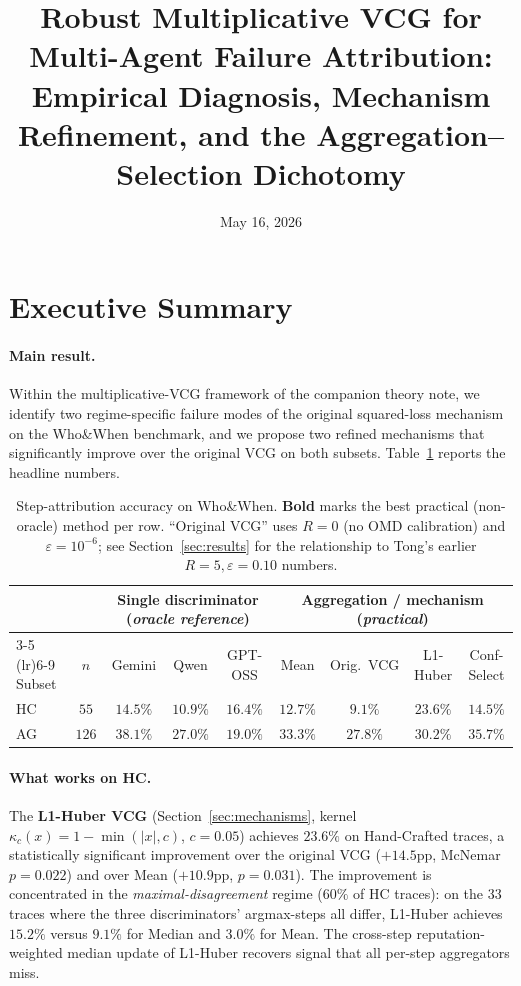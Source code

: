 \documentclass[11pt]{article}
\title{Robust Multiplicative VCG for Multi-Agent Failure Attribution:\\
{\large Empirical Diagnosis, Mechanism Refinement, and the Aggregation--Selection Dichotomy}}
\author{}
\date{May 16, 2026}
\begin{document}
\maketitle

\section*{Executive Summary}

\paragraph{Main result.}
Within the multiplicative-VCG framework of the companion theory note, we
identify two regime-specific failure modes of the original squared-loss
mechanism on the Who\&When benchmark, and we propose two refined
mechanisms that significantly improve over the original VCG on both
subsets. Table~\ref{tab:summary-positive} reports the headline numbers.

\begin{table}[h]
\centering
\small
\caption{Step-attribution accuracy on Who\&When. \textbf{Bold} marks the
best practical (non-oracle) method per row. ``Original VCG'' uses
$R = 0$ (no OMD calibration) and $\varepsilon = 10^{-6}$; see
Section~\ref{sec:results} for the relationship to Tong's earlier
$R = 5, \varepsilon = 0.10$ numbers.}
\label{tab:summary-positive}
\setlength{\tabcolsep}{4pt}
\begin{tabular}{lcccccccc}
\toprule
& & \multicolumn{3}{c}{Single discriminator (\emph{oracle reference})} & \multicolumn{4}{c}{Aggregation / mechanism (\emph{practical})} \\
\cmidrule(lr){3-5} \cmidrule(lr){6-9}
Subset & $n$ & Gemini & Qwen & GPT-OSS & Mean & Orig.~VCG & L1-Huber & Conf-Select \\
\midrule
HC & $55$  & $14.5\%$ & $10.9\%$ & $16.4\%$ & $12.7\%$ & $9.1\%$  & $\mathbf{23.6\%}$ & $14.5\%$ \\
AG & $126$ & $38.1\%$ & $27.0\%$ & $19.0\%$ & $33.3\%$ & $27.8\%$ & $30.2\%$ & $\mathbf{35.7\%}$ \\
\bottomrule
\end{tabular}
\end{table}

\paragraph{What works on HC.}
The \textbf{L1-Huber VCG} (Section~\ref{sec:mechanisms}, kernel
$\kappa_c(x) = 1 - \min(|x|, c)$, $c = 0.05$) achieves $23.6\%$ on
Hand-Crafted traces, a statistically significant improvement over the
original VCG ($+14.5$pp, McNemar $p = 0.022$) and over Mean
($+10.9$pp, $p = 0.031$). The improvement is concentrated in the
\emph{maximal-disagreement} regime ($60\%$ of HC traces): on the $33$
traces where the three discriminators' argmax-steps all differ, L1-Huber
achieves $15.2\%$ versus $9.1\%$ for Median and $3.0\%$ for Mean. The
cross-step reputation-weighted median update of L1-Huber recovers signal
that all per-step aggregators miss.
\end{document}
